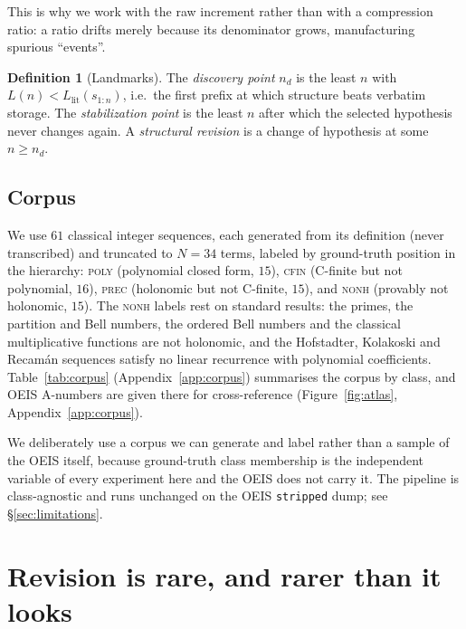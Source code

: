 \documentclass[10pt]{article}
\theoremstyle{definition}
\newtheorem{definition}{Definition}
\theoremstyle{plain}
\newcommand{\Llit}{L_{\mathrm{lit}}}
\newcommand{\nd}{n_{d}}
\begin{document}
This is why we work with the raw increment rather than with a compression
ratio: a ratio drifts merely because its denominator grows, manufacturing
spurious ``events''.

\begin{definition}[Landmarks]
The \emph{discovery point} $\nd$ is the least $n$ with $L(n) < \Llit(s_{1:n})$,
i.e.\ the first prefix at which structure beats verbatim storage. The
\emph{stabilization point} is the least $n$ after which the selected hypothesis
never changes again. A \emph{structural revision} is a change of hypothesis at
some $n \ge \nd$.
\end{definition}

\subsection{Corpus}

We use $61$ classical integer sequences, each generated from its definition
(never transcribed) and truncated to $N = 34$ terms, labeled by ground-truth
position in the hierarchy: \textsc{poly} (polynomial closed form, $15$),
\textsc{cfin} (C-finite but not polynomial, $16$), \textsc{prec} (holonomic but
not C-finite, $15$), and \textsc{nonh} (provably not holonomic, $15$). The
\textsc{nonh} labels rest on standard results: the primes, the partition and
Bell numbers, the ordered Bell numbers and the classical multiplicative
functions are not holonomic, and the Hofstadter, Kolakoski and Recam\'an
sequences satisfy no linear recurrence with polynomial coefficients.
Table~\ref{tab:corpus} (Appendix~\ref{app:corpus}) summarises the corpus by
class, and OEIS A-numbers are given there for cross-reference
(Figure~\ref{fig:atlas}, Appendix~\ref{app:corpus}).

We deliberately use a corpus we can generate and label rather than a sample of
the OEIS itself, because ground-truth class membership is the independent
variable of every experiment here and the OEIS does not carry it. The pipeline
is class-agnostic and runs unchanged on the OEIS \texttt{stripped} dump; see
\S\ref{sec:limitations}.

\section{Revision is rare, and rarer than it looks}
\label{sec:revfree}
\end{document}
